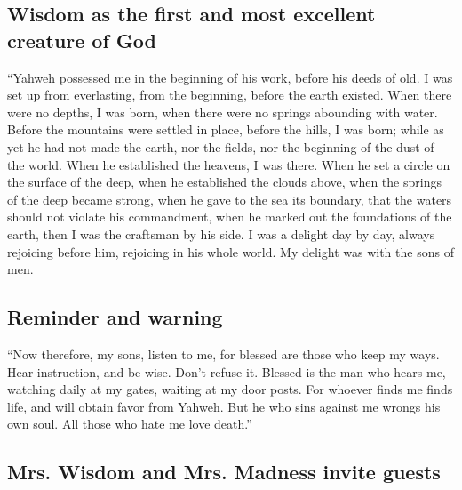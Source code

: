 \hypertarget{wisdom-as-the-first-and-most-excellent-creature-of-god}{%
\subsection{Wisdom as the first and most excellent creature of
God}\label{wisdom-as-the-first-and-most-excellent-creature-of-god}}

 ``Yahweh possessed me in the beginning of his work,
before his deeds of old.  I was set up from everlasting,
from the beginning, before the earth existed.  When there
were no depths, I was born, when there were no springs abounding with
water.  Before the mountains were settled in place,
before the hills, I was born;  while as yet he had not
made the earth, nor the fields, nor the beginning of the dust of the
world.  When he established the heavens, I was there.
When he set a circle on the surface of the deep,  when he
established the clouds above, when the springs of the deep became
strong,  when he gave to the sea its boundary, that the
waters should not violate his commandment, when he marked out the
foundations of the earth,  then I was the craftsman by
his side. I was a delight day by day, always rejoicing before him,
 rejoicing in his whole world. My delight was with the
sons of men.

\hypertarget{reminder-and-warning}{%
\subsection{Reminder and warning}\label{reminder-and-warning}}

 ``Now therefore, my sons, listen to me, for blessed are
those who keep my ways.  Hear instruction, and be wise.
Don't refuse it.  Blessed is the man who hears me,
watching daily at my gates, waiting at my door posts. 
For whoever finds me finds life, and will obtain favor from Yahweh.
 But he who sins against me wrongs his own soul. All
those who hate me love death.''

\hypertarget{mrs.-wisdom-and-mrs.-madness-invite-guests}{%
\subsection{Mrs. Wisdom and Mrs. Madness invite
guests}\label{mrs.-wisdom-and-mrs.-madness-invite-guests}}

